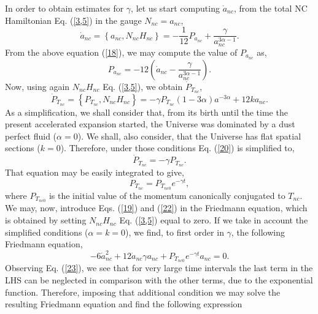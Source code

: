 \documentclass[12pt]{article}
\newcommand{\0}{{(0)}}
\newcommand{\1}{{(1)}}
\newcommand{\2}{{(2)}}
\begin{document}
{In order to obtain estimates for $\gamma$, let us start computing $\dot{a}_{nc}$, from the total NC 
Hamiltonian Eq. (\ref{3,5}) in the gauge $N_{nc}=a_{nc}$,
\begin{equation}
\label{18}
\dot{a}_{nc} = \left\{ a_{nc}, N_{nc}H_{nc}  \right\} = - \frac{1}{12}P_{a_{nc}} + \frac{\gamma}{a_{nc}^{3\alpha - 1}}.
\end{equation}
From the above equation (\ref{18}), we may compute the value of $P_{a_{nc}}$ as,
\begin{equation}
\label{19}
P_{a_{nc}} = -12\left(\dot{a}_{nc} - \frac{\gamma}{a_{nc}^{3\alpha - 1}}\right).
\end{equation}
Now, using again $N_{nc}H_{nc}$ Eq. (\ref{3,5}), we obtain $\dot{P}_{T_{nc}}$,
\begin{equation}
\label{20}
\dot{P}_{T_{nc}} = \left\{ P_{T_{nc}}, N_{nc}H_{nc}  \right\} = -\gamma P_{T_{nc}} (1 - 3\alpha)a^{-3\alpha}+12ka_{nc}.
\end{equation}
As a simplification, we shall consider that, from its birth until the time the present accelerated
expansion started, the Universe was dominated by a dust perfect fluid ($\alpha=0$). We shall, also consider, that the Universe
has flat spatial sections ($k=0$). Therefore, under those conditions Eq. (\ref{20}) is simplified to,
\begin{equation}
\label{21}
\dot{P}_{T_{nc}} = -\gamma P_{T_{nc}}.
\end{equation}
That equation may be easily integrated to give,
\begin{equation}
\label{22}
P_{T_{nc}} = P_{T_{nc0}}e^{-\gamma t},
\end{equation}
where $P_{T_{nc0}}$ is the initial value of the momentum canonically conjugated to $T_{nc}$.
We may, now, introduce Eqs. (\ref{19}) and (\ref{22}) in the Friedmann equation, which is
obtained by setting $N_{nc}H_{nc}$ Eq. (\ref{3,5}) equal to zero. If we take in account the simplified
conditions ($\alpha=k=0$), we find, to first order in $\gamma$, the following Friedmann equation,
\begin{equation}
\label{23}
-6\dot{a}^2_{nc} + 12 \dot{a}_{nc}\gamma a_{nc} + P_{T_{nc0}}e^{-\gamma t} a_{nc} = 0 .
\end{equation}
Observing Eq. (\ref{23}), we see that for very large time intervals the last term in the LHS can be
neglected in comparison with the other terms, due to the exponential function. Therefore, imposing that
additional condition we may solve the resulting Friedmann equation and find the following expression
}
\end{document}
